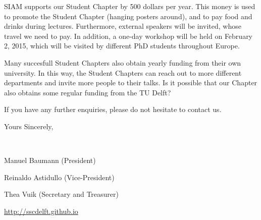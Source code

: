 \documentclass[a4paper,10pt]{article}
\begin{document}
\bigskip
SIAM supports our Student Chapter by 500 dollars per year. This money is used to promote the Student Chapter (hanging posters around), and to pay food and drinks during lectures. Furthermore, external speakers will be invited, whose travel we need to pay. In addition, a one-day workshop will be held on February 2, 2015, which will be visited by different PhD students throughout Europe. 

\bigskip
Many succesfull Student Chapters also obtain yearly funding from their own university. In this way, the Student Chapters can reach out to more different departments and invite more people to their talks. Is it possible that our Chapter also obtains some regular funding from the TU Delft?

\bigskip
If you have any further enquiries, please do not hesitate to contact us.

\bigskip
Yours Sincerely,

\bigskip
\ 

\bigskip
Manuel Baumann (President)

Reinaldo Astidullo (Vice-President)

Thea Vuik (Secretary and Treasurer)

\url{http://sscdelft.github.io}
\end{document}
